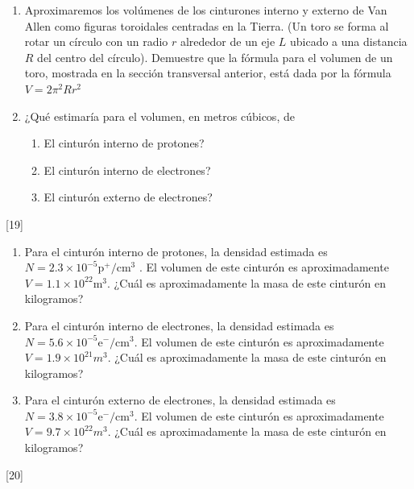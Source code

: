 \documentclass[a4paper]{article}
\newcommand{\m}{\text{m}}
\newcommand{\cm}{\text{cm}}
\newcommand{\protones}{\text{p}^+}
\newcommand{\electrones}{\text{e}^-}
\newcounter{problema}
\begin{document}
\begin{problema}

\begin{enumerate}
	\item  Aproximaremos los volúmenes de los cinturones interno y externo de Van Allen como figuras toroidales centradas en la Tierra. (Un toro se forma al rotar un círculo con un radio $r$ alrededor de un eje $L$ ubicado a una distancia $R$ del centro del círculo). Demuestre que la fórmula para el volumen de un toro, mostrada en la sección transversal anterior, está dada por la fórmula $V = 2\pi^2Rr^2$
	\item ¿Qué estimaría para el volumen, en metros cúbicos, de 
	\begin{enumerate}
		\item El cinturón interno de protones?
		\item El cinturón interno de electrones?
		\item El cinturón externo de electrones?
	\end{enumerate}
\end{enumerate}
[19]

\end{problema}


\begin{problema}

\begin{enumerate}
	\item Para el cinturón interno de protones, la densidad estimada es $N = 2.3 \times 10^{-5} \protones/\cm^3$ . El volumen de este cinturón es aproximadamente $V = 1.1 \times 10^{22}\m^3$. ¿Cuál es aproximadamente la masa de este cinturón en kilogramos?
	\item Para el cinturón interno de electrones, la densidad estimada es $N = 5.6 \times 10^{-5} \electrones/\cm^3$. El volumen de este cinturón es aproximadamente $V = 1.9 \times 10^{21}m^3$. ¿Cuál es aproximadamente la masa de este cinturón en kilogramos?
	\item Para el cinturón externo de electrones, la densidad estimada es $N = 3.8 \times 10^{-5} \electrones/\cm^3$. El volumen de este cinturón es aproximadamente $V = 9.7 \times 10^{22}m^3$. ¿Cuál es aproximadamente la masa de este cinturón en kilogramos?
\end{enumerate}

\end{problema}
[20]


\cite{RadiationMath}


\end{document}
